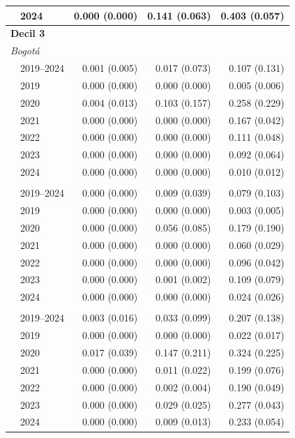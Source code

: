 \begin{table}[htbp]
\begin{tabular}{llrrr}
 & 2024 & 0.000 (0.000) & 0.141 (0.063) & 0.403 (0.057) \\
\midrule
\multicolumn{5}{l}{\textbf{Decil 3}} \\
\multicolumn{5}{l}{\textit{Bogotá}} \\
 & 2019–2024 & 0.001 (0.005) & 0.017 (0.073) & 0.107 (0.131) \\
 & 2019 & 0.000 (0.000) & 0.000 (0.000) & 0.005 (0.006) \\
 & 2020 & 0.004 (0.013) & 0.103 (0.157) & 0.258 (0.229) \\
 & 2021 & 0.000 (0.000) & 0.000 (0.000) & 0.167 (0.042) \\
 & 2022 & 0.000 (0.000) & 0.000 (0.000) & 0.111 (0.048) \\
 & 2023 & 0.000 (0.000) & 0.000 (0.000) & 0.092 (0.064) \\
 & 2024 & 0.000 (0.000) & 0.000 (0.000) & 0.010 (0.012) \\
\addlinespace[2pt]
\multicolumn{5}{l}{\textit{Medellín}} \\
 & 2019–2024 & 0.000 (0.000) & 0.009 (0.039) & 0.079 (0.103) \\
 & 2019 & 0.000 (0.000) & 0.000 (0.000) & 0.003 (0.005) \\
 & 2020 & 0.000 (0.000) & 0.056 (0.085) & 0.179 (0.190) \\
 & 2021 & 0.000 (0.000) & 0.000 (0.000) & 0.060 (0.029) \\
 & 2022 & 0.000 (0.000) & 0.000 (0.000) & 0.096 (0.042) \\
 & 2023 & 0.000 (0.000) & 0.001 (0.002) & 0.109 (0.079) \\
 & 2024 & 0.000 (0.000) & 0.000 (0.000) & 0.024 (0.026) \\
\addlinespace[2pt]
\multicolumn{5}{l}{\textit{Cali}} \\
 & 2019–2024 & 0.003 (0.016) & 0.033 (0.099) & 0.207 (0.138) \\
 & 2019 & 0.000 (0.000) & 0.000 (0.000) & 0.022 (0.017) \\
 & 2020 & 0.017 (0.039) & 0.147 (0.211) & 0.324 (0.225) \\
 & 2021 & 0.000 (0.000) & 0.011 (0.022) & 0.199 (0.076) \\
 & 2022 & 0.000 (0.000) & 0.002 (0.004) & 0.190 (0.049) \\
 & 2023 & 0.000 (0.000) & 0.029 (0.025) & 0.277 (0.043) \\
 & 2024 & 0.000 (0.000) & 0.009 (0.013) & 0.233 (0.054) \\
\bottomrule
\end{tabular}
\vspace{0.5em}
\endgroup
\end{table}
